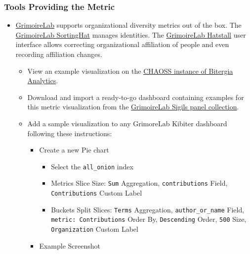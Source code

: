 \hypertarget{tools-providing-the-metric}{%
\subsubsection{Tools Providing the
Metric}\label{tools-providing-the-metric}}

\begin{itemize}
\item
  \href{https://chaoss.github.io/grimoirelab}{GrimoireLab} supports
  organizational diversity metrics out of the box. The
  \href{https://github.com/chaoss/grimoirelab-sortinghat}{GrimoireLab
  SortingHat} manages identities. The
  \href{https://github.com/chaoss/grimoirelab-hatstall}{GrimoireLab
  Hatstall} user interface allows correcting organizational affiliation
  of people and even recording affiliation changes.

  \begin{itemize}
  \item
    View an example visualization on the
    \href{https://chaoss.biterg.io/app/kibana\#/dashboard/Community-Structure-by-Organization}{CHAOSS
    instance of Bitergia Analytics}.
  \item
    Download and import a ready-to-go dashboard containing examples for
    this metric visualization from the
    \href{https://chaoss.github.io/grimoirelab-sigils/panels/community-structure-by-organization/}{GrimoireLab
    Sigils panel collection}.
  \item
    Add a sample visualization to any GrimoreLab Kibiter dashboard
    following these instructions:

    \begin{itemize}
    \tightlist
    \item
      Create a new Pie chart

      \begin{itemize}
      \tightlist
      \item
        Select the \texttt{all\_onion} index
      \item
        Metrics Slice Size: \texttt{Sum} Aggregation,
        \texttt{contributions} Field, \texttt{Contributions} Custom
        Label
      \item
        Buckets Split Slices: \texttt{Terms} Aggregation,
        \texttt{author\_or\_name} Field, \texttt{metric:\ Contributions}
        Order By, \texttt{Descending} Order, \texttt{500} Size,
        \texttt{Organization} Custom Label
      \end{itemize}
    \item
      Example Screenshot
    \end{itemize}


\end{itemize}
\end{itemize}
